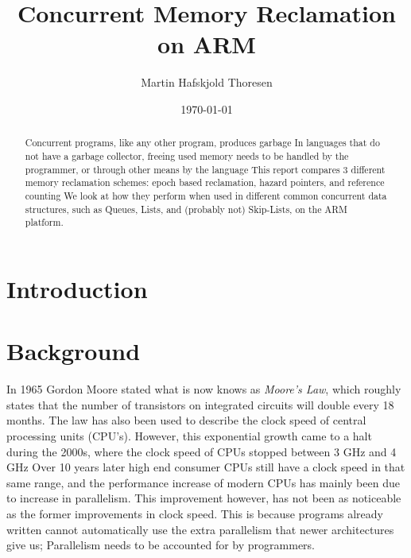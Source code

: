 \documentclass[b5paper]{report}
\begin{document}
\title{Concurrent Memory Reclamation on ARM}
\author{Martin Hafskjold Thoresen}
\date{\today}
\maketitle



\begin{abstract}
  Concurrent programs, like any other program, produces garbage In languages
  that do not have a garbage collector, freeing used memory needs to be
  handled by the programmer, or through other means by the language This
  report compares 3 different memory reclamation schemes: epoch based
  reclamation, hazard pointers, and reference counting We look at how they
  perform when used in different common concurrent data structures, such as
  Queues, Lists, and (probably not) Skip-Lists, on the ARM platform.
\end{abstract}

\tableofcontents

\chapter{Introduction}

\chapter{Background}

In 1965 Gordon Moore stated what is now knows as \emph{Moore's Law}, which
roughly states that the number of transistors on integrated circuits will
double every 18 months. The law has also been used to describe the clock speed
of central processing units (CPU's). However, this exponential growth came to a
halt during the 2000s, where the clock speed of CPUs stopped between 3 GHz and
4 GHz Over 10 years later high end consumer CPUs still have a clock speed in
that same range, and the performance increase of modern CPUs has mainly been
due to increase in parallelism. This improvement however, has not been as
noticeable as the former improvements in clock speed. This is because programs
already written cannot automatically use the extra parallelism that newer
architectures give us; Parallelism needs to be accounted for by programmers.
\end{document}

